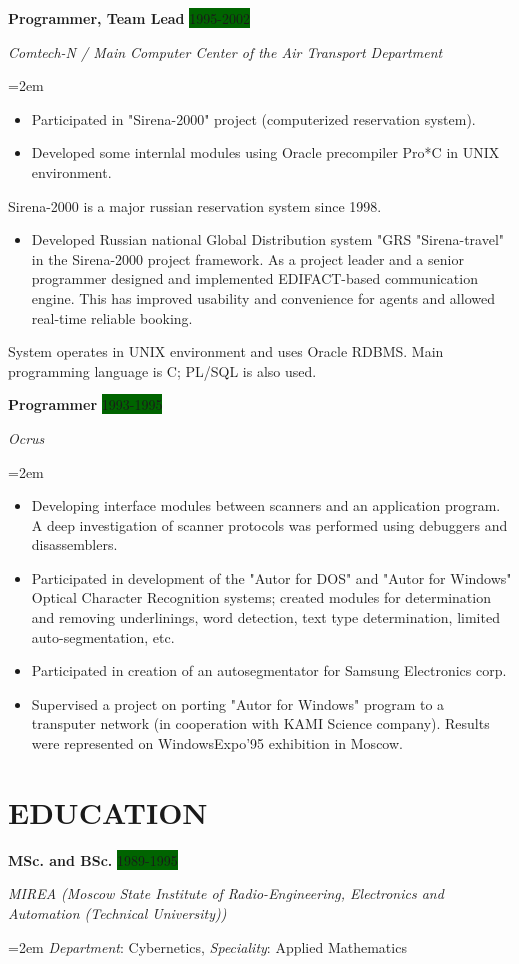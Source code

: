 \documentclass[paper=a4,fontsize=10.5pt]{scrartcl} %
\newcommand{\sepspace}{\vspace*{1em}}       %
\newcommand{\NewPart}[1]{\section*{\uppercase{#1}}}
\newcommand{\EducationEntry}[4]{\pagebreak[2]
        \noindent \textbf{#1} \hfill      %
        \colorbox{DarkGreen}{%
            \hfill\color{White}#2} \par  %
        \noindent \textit{#3} \par        %
        \noindent\hangindent=2em\hangafter=0 \small #4 %
        \normalsize \par}
\newcommand{\WorkEntry}[4]{\pagebreak[2]    %
        \noindent \textbf{#1} \hfill      %
        \colorbox{DarkGreen}{\color{White}#2} \par  %
        \noindent \textit{#3} \par        %
        \noindent\hangindent=2em\hangafter=0 \small #4 %
        \normalsize \par         \sepspace}
\begin{document}
\WorkEntry{Programmer, Team Lead}{1995-2002}{Comtech-N / Main Computer Center of the Air Transport Department}{
\begin{itemize}\itemsep0em
\item Participated in "Sirena-2000" project  (computerized reservation system).
\item Developed some internlal modules using Oracle precompiler Pro*C in UNIX environment.
\end{itemize}
Sirena-2000 is a major russian reservation system since 1998.
\begin{itemize}\itemsep0em
\item Developed Russian national Global Distribution system "GRS "Sirena-travel" in the Sirena-2000 project framework. As a project leader and a senior programmer designed and implemented EDIFACT-based communication engine. This has improved usability and convenience for agents and allowed real-time reliable booking.
\end{itemize}
System operates in UNIX environment and uses Oracle RDBMS.
Main programming language is C; PL/SQL is also used.
}

\WorkEntry{Programmer}{1993-1995}{Ocrus}{
\begin{itemize}\itemsep0em
\item Developing interface modules between scanners and an application program. A deep investigation of scanner protocols was performed using debuggers and disassemblers.
\item Participated in development of the "Autor for DOS" and "Autor  for  Windows" Optical Character  Recognition systems; created modules for determination and removing underlinings, word detection, text type determination, limited auto-segmentation, etc.
\item Participated in creation of an autosegmentator for Samsung Electronics corp.
\item Supervised a project on porting "Autor for Windows" program to a transputer network (in cooperation with KAMI Science company). Results were represented on WindowsExpo'95 exhibition in Moscow.
\end{itemize}
}


\NewPart{Education}{}

\EducationEntry{MSc. and BSc.}{1989-1995}{MIREA (Moscow State Institute of Radio-Engineering, Electronics and Automation (Technical University))}{\textit{Department}: Cybernetics, \textit{Speciality}: Applied Mathematics}
\sepspace
\end{document}
